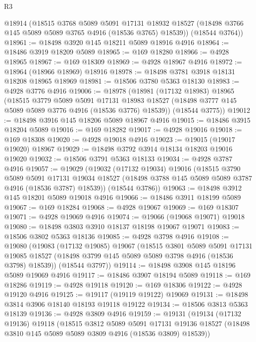 \begin{lexlean}{R3}
\begin{coremodule}
      @18914
      (@18515
        @3768
        @5089
        @5091
        @17131
        @18932
        @18527
        (@18498 @3766 @145 @5089 @5089 @3765 @4916 (@18536 @3765) @18539))
      (@18544 @3764))
@18961 := @18498 @3920 @145 @18211 @5089 @18916 @4916
@18964 := @18486 @3919 @18209 @5089
@18965 := @169 @18280
@18966 := @4928 @18965
@18967 := @169 @18309
@18969 := @4928 @18967 @4916
@18972 := @18964 (@18966 @18969) @18916
@18978 := @18498 @3781 @3918 @18131 @18208 @18965 @18969
@18981 := @18506 @3780 @5363 @18130
@18983 := @4928 @3776 @4916
@19006 := @18978
    (@18981
      (@17132 @18983)
      @18965
      (@18515
        @3779
        @5089
        @5091
        @17131
        @18983
        @18527
        (@18498 @3777 @145 @5089 @5089 @3776 @4916 (@18536 @3776) @18539))
      (@18544 @3775))
@19012 := @18498 @3916 @145 @18206 @5089 @18967 @4916
@19015 := @18486 @3915 @18204 @5089
@19016 := @169 @18282
@19017 := @4928 @19016
@19018 := @169 @18308
@19020 := @4928 @19018 @4916
@19023 := @19015 (@19017 @19020) @18967
@19029 := @18498 @3792 @3914 @18134 @18203 @19016 @19020
@19032 := @18506 @3791 @5363 @18133
@19034 := @4928 @3787 @4916
@19057 := @19029
    (@19032
      (@17132 @19034)
      @19016
      (@18515
        @3790
        @5089
        @5091
        @17131
        @19034
        @18527
        (@18498 @3788 @145 @5089 @5089 @3787 @4916 (@18536 @3787) @18539))
      (@18544 @3786))
@19063 := @18498 @3912 @145 @18201 @5089 @19018 @4916
@19066 := @18486 @3911 @18199 @5089
@19067 := @169 @18284
@19068 := @4928 @19067
@19069 := @169 @18307
@19071 := @4928 @19069 @4916
@19074 := @19066 (@19068 @19071) @19018
@19080 := @18498 @3803 @3910 @18137 @18198 @19067 @19071
@19083 := @18506 @3802 @5363 @18136
@19085 := @4928 @3798 @4916
@19108 := @19080
    (@19083
      (@17132 @19085)
      @19067
      (@18515
        @3801
        @5089
        @5091
        @17131
        @19085
        @18527
        (@18498 @3799 @145 @5089 @5089 @3798 @4916 (@18536 @3798) @18539))
      (@18544 @3797))
@19114 := @18498 @3908 @145 @18196 @5089 @19069 @4916
@19117 := @18486 @3907 @18194 @5089
@19118 := @169 @18286
@19119 := @4928 @19118
@19120 := @169 @18306
@19122 := @4928 @19120 @4916
@19125 := @19117 (@19119 @19122) @19069
@19131 := @18498 @3814 @3906 @18140 @18193 @19118 @19122
@19134 := @18506 @3813 @5363 @18139
@19136 := @4928 @3809 @4916
@19159 := @19131
    (@19134
      (@17132 @19136)
      @19118
      (@18515
        @3812
        @5089
        @5091
        @17131
        @19136
        @18527
        (@18498 @3810 @145 @5089 @5089 @3809 @4916 (@18536 @3809) @18539))

\end{coremodule}
\end{lexlean}
